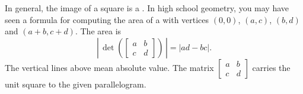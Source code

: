 \begin{myfig}
\capstart
{}
\caption{Image of the unit square via the mapping
$A$.\label{linalg-imagesquare:fig}}
\end{myfig}

In general, the image of a square is a .
In high school geometry, you may have seen a formula for
computing the area of a 
with vertices $(0,0)$, $(a,c)$, $(b,d)$
and $(a+b,c+d)$.  The area is
\begin{equation*}
\left\lvert \, \det \left(
\begin{bmatrix} a & b \\ c & d \end{bmatrix}
\right) \, \right\rvert
=
\lvert
a d - b c
\rvert
.
\end{equation*}
The vertical lines above mean absolute value.
The matrix $\left[ \begin{smallmatrix} a & b \\ c & d \end{smallmatrix}
\right]$
carries the unit square to the given parallelogram.

\medskip

